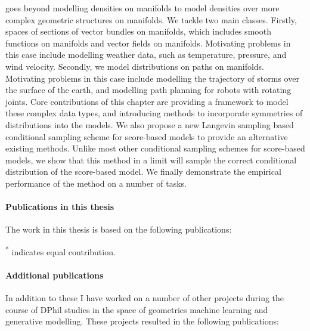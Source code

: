  goes beyond modelling densities on manifolds to model densities over more complex geometric structures on manifolds.
We tackle two main classes. 
Firstly, spaces of sections of vector bundles on manifolds, which includes smooth functions on manifolds and vector fields on manifolds.
Motivating problems in this case include modelling weather data, such as temperature, pressure, and wind velocity.
Secondly, we model distributions on paths on manifolds.
Motivating problems in this case include modelling the trajectory of storms over the surface of the earth, and modelling path planning for robots with rotating joints.
Core contributions of this chapter are providing a framework to model these complex data types, and introducing methods to incorporate symmetries of distributions into the models.
We also propose a new Langevin sampling based conditional sampling scheme for score-based models to provide an alternative existing methods.
Unlike most other conditional sampling schemes for score-based models, we show that this method in a limit will sample the correct conditional distribution of the score-based model.
We finally demonstrate the empirical performance of the method on a number of tasks. 

\nocite{de2022riemannian_hl, fishman2023diffusion_hl, fishman2023metropolis_hl, mathieu2024geometric_hl}

\paragraph{Publications in this thesis}

The work in this thesis is based on the following publications:

\textsuperscript{*} indicates equal contribution.

\paragraph{Additional publications}

In addition to these I have worked on a number of other projects during the course of DPhil studies in the space of geometrics machine learning and generative modelling. These projects resulted in the following publications:
\nocite{hutchinson2021lietransformer_hl,holderith2021equivariant_hl,thornton2022riemannian_hl,phillips2022spectral_hl,hutchinson2021federatedffunctional_hl,hutchinson2021vector_hl, phillips2024particle,de2024target}

